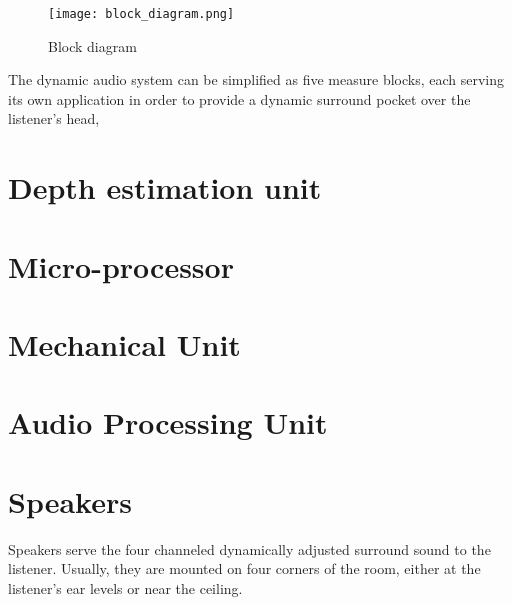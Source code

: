 \documentclass[../../../patent_v1.tex]{subfiles}
\begin{document}
\begin{figure*}
    \texttt{[image: block\_diagram.png]}
    \caption{Block diagram}
\end{figure*}

\FloatBarrier

The dynamic audio system can be simplified as five measure blocks, each serving its 
own application in order to provide a dynamic surround pocket over the listener's head,

\section{Depth estimation unit}



\section{Micro-processor}



\section{Mechanical Unit}



\section{Audio Processing Unit}



\section{Speakers}

Speakers serve the four channeled dynamically adjusted surround sound to the listener. 
Usually, they are mounted on four corners of the room, either at the listener's ear 
levels or near the ceiling.
\end{document}
